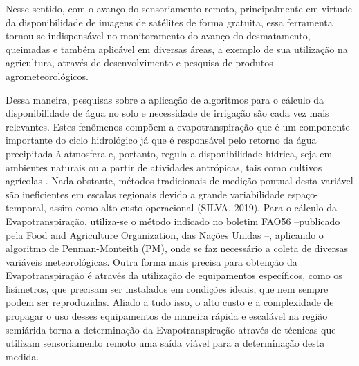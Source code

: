 \documentclass[fleqn]{icat-ufal}
\begin{document}
Nesse sentido, com o avanço do sensoriamento remoto, principalmente em virtude da disponibilidade de imagens de satélites de forma gratuita, essa ferramenta tornou-se indispensável no monitoramento do avanço do desmatamento, queimadas e também aplicável em diversas áreas, a exemplo de sua utilização na agricultura, através de desenvolvimento e pesquisa de produtos agrometeorológicos.

Dessa maneira, pesquisas sobre a aplicação de algoritmos para o cálculo da disponibilidade de água no solo e necessidade de irrigação são cada vez mais relevantes. Estes fenômenos compõem a evapotranspiração que é um componente importante do ciclo hidrológico já que é responsável pelo retorno da água precipitada à atmosfera e, portanto, regula a disponibilidade hídrica, seja em ambientes naturais ou a partir de atividades antrópicas, tais como cultivos agrícolas . Nada obstante, métodos tradicionais de medição pontual desta variável são ineficientes em escalas regionais devido a grande variabilidade espaço-temporal, assim como alto custo operacional (SILVA, 2019). 
Para o cálculo da Evapotranspiração, utiliza-se o método indicado no boletim FAO56 –publicado pela Food and Agriculture Organization, das Nações Unidas –, aplicando o algoritmo de Penman-Monteith (PM), onde se faz necessário a coleta de diversas variáveis meteorológicas. Outra forma mais precisa para obtenção da Evapotranspiração é através da utilização de equipamentos específicos, como os lisímetros, que precisam ser instalados em condições ideais, que nem sempre podem ser reproduzidas. Aliado a tudo isso, o alto custo e a complexidade de propagar o uso desses equipamentos de maneira rápida e escalável na região semiárida torna a determinação da Evapotranspiração através de técnicas que utilizam sensoriamento remoto uma saída viável para a determinação desta medida.
\end{document}
